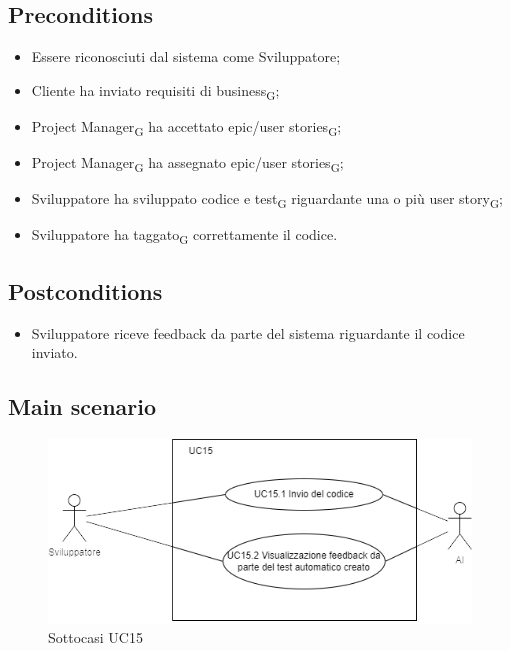 \documentclass{article}
\begin{document}
    \subsection*{Preconditions}
        \begin{itemize}
            \item Essere riconosciuti dal sistema come Sviluppatore;
            \item Cliente ha inviato requisiti di business\textsubscript{G};
            \item Project Manager\textsubscript{G} ha accettato epic/user stories\textsubscript{G};
            \item Project Manager\textsubscript{G} ha assegnato epic/user stories\textsubscript{G};
            \item Sviluppatore ha sviluppato codice e test\textsubscript{G} riguardante una o più user story\textsubscript{G};
            \item Sviluppatore ha taggato\textsubscript{G} correttamente il codice.
        \end{itemize}
        
    \subsection*{Postconditions}
        \begin{itemize}
            \item Sviluppatore riceve feedback da parte del sistema riguardante il codice inviato.
        \end{itemize}
    
    \subsection*{Main scenario}
        \begin{figure}[h]
          \centering
          \includegraphics{./imgUML/UC15-zoom.png}
          \caption{Sottocasi UC15}
          \label{fig:UC15_sottocasi}
        \end{figure}
        
\end{document}
